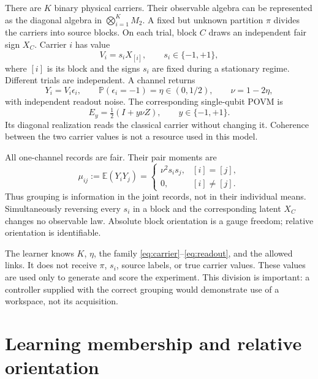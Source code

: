 \documentclass[11pt]{article}
\theoremstyle{definition}
\theoremstyle{remark}
\newcommand{\E}{\mathbb E}
\newcommand{\Prb}{\mathbb P}
\begin{document}
There are $K$ binary physical carriers. Their observable algebra can be represented as the diagonal algebra in $\bigotimes_{i=1}^K M_2$. A fixed but unknown partition $\pi$ divides the carriers into source blocks. On each trial, block $C$ draws an independent fair sign $X_C$. Carrier $i$ has value
\begin{equation}
 V_i=s_iX_{[i]},\qquad s_i\in\{-1,+1\},
 \label{eq:carrier}
\end{equation}
where $[i]$ is its block and the signs $s_i$ are fixed during a stationary regime. Different trials are independent. A channel returns
\begin{equation}
 Y_i=V_i\epsilon_i,\qquad
 \Prb(\epsilon_i=-1)=\eta\in(0,1/2),\qquad \nu=1-2\eta,
 \label{eq:readout}
\end{equation}
with independent readout noise. The corresponding single-qubit POVM is
\begin{equation}
 E_y=\tfrac12(I+y\nu Z),\qquad y\in\{-1,+1\}.
\end{equation}
Its diagonal realization reads the classical carrier without changing it. Coherence between the two carrier values is not a resource used in this model.

All one-channel records are fair. Their pair moments are
\begin{equation}
 \mu_{ij}:=\E(Y_iY_j)=
 \begin{cases}
  \nu^2s_is_j,&[i]=[j],\\
  0,&[i]\ne[j].
 \end{cases}
 \label{eq:moments}
\end{equation}
Thus grouping is information in the joint records, not in their individual means. Simultaneously reversing every $s_i$ in a block and the corresponding latent $X_C$ changes no observable law. Absolute block orientation is a gauge freedom; relative orientation is identifiable.

The learner knows $K$, $\eta$, the family \eqref{eq:carrier}--\eqref{eq:readout}, and the allowed links. It does not receive $\pi$, $s_i$, source labels, or true carrier values. These values are used only to generate and score the experiment. This division is important: a controller supplied with the correct grouping would demonstrate use of a workspace, not its acquisition.

\section{Learning membership and relative orientation}
\label{sec:learning}
\end{document}
